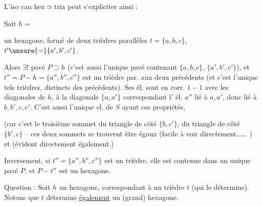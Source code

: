 
L'iso can $\mathrm{hex}\simeq\mathrm{tria}$ peut s'expliciter ainsi :

Soit $h=$


un hexagone,  formé de deux trièdres parallèles $t=\{a,b,c\}$, $t'\unsure{=}\{a',b',c'\}$.


Alors $\exists!$ pavé $P\supset h$ (c'est aussi l'unique pavé contenant $\{a,b,c\}$,  $\{a',b',c'\}$), et $t''=P-h=\{a'',b'',c''\}$ est un trièdre par. aux deux précédents (et c'est l'unique tels trièdres, distincts des précédents). Ses él. sont en corr. $1-1$ avec les diagonales de $h$, à la diagonale $\{a,a'\}$ correspondant l' él. $a''$    lié à $a,a'$, donc lié à $b,b',c,c'$. C'est aussi l'unique el. de $S$ ayant ces propriétés,

(car c'est le troisième sommet du triangle de côté $\{b,c'\}$,  du triangle de côté $\{b',c\}$ -- ces deux sommets se trouvent  être égaux (facile à voir directement\ldots\ldots\ ) et    (évident directement également.)

Inversement, si $t''=\{a'',b'',c''\}$ est un trièdre, elle est contenue dans un unique pavé $P$, et $P-t''$ est un hexagone.

Question : Soit $h$ un  hexagone, correspondant à un trièdre $t$ (qui le détermine). Notons que $t$ détermine \uline{également} un (grand) hexagone.

